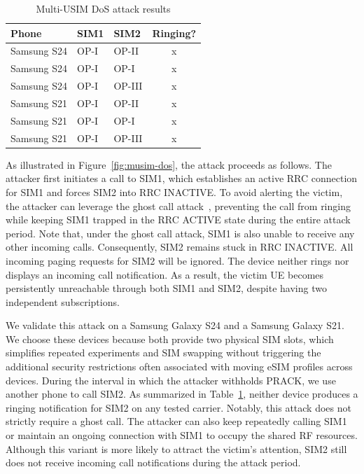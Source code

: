 \vspace{-0.1in}
\begin{table}[H]
\centering
\caption{Multi-USIM DoS attack results}
\vspace{-0.1in}
\label{tab:dual_sim_ringing_data}
\small
\begin{tabular}{l l l c}
\hline
\textbf{Phone} & \textbf{SIM1} & \textbf{SIM2} & \textbf{Ringing?} \\
\hline
Samsung S24 & OP-I & OP-II  & x \\
Samsung S24 & OP-I & OP-I   & x \\
Samsung S24 & OP-I & OP-III & x \\
Samsung S21 & OP-I & OP-II  & x \\
Samsung S21 & OP-I & OP-I   & x \\
Samsung S21 & OP-I & OP-III & x \\
\hline
\end{tabular}
\end{table}

As illustrated in Figure~\ref{fig:musim-dos}, the attack proceeds as follows.
The attacker first initiates a call to SIM1, which establishes an active RRC connection for SIM1 and forces SIM2 into RRC INACTIVE. To avoid alerting the victim, the attacker can leverage the ghost call attack~\cite{lu2020ghost,wang2021insecurity}, preventing the call from ringing while keeping SIM1 trapped in the RRC ACTIVE state during the entire attack period. 
Note that, under the ghost call attack, SIM1 is also unable to receive any other incoming calls. Consequently, SIM2 remains stuck in RRC INACTIVE. All incoming paging requests for SIM2 will be ignored. The device neither rings nor displays an incoming call notification. As a result, the victim UE becomes persistently unreachable through both SIM1 and SIM2, despite having two independent subscriptions.   


We validate this attack on a Samsung Galaxy S24 and a Samsung Galaxy S21. We choose these devices because both provide two physical SIM slots, which simplifies repeated experiments and SIM swapping without triggering the additional security restrictions often associated with moving eSIM profiles across devices. During the interval in which the attacker withholds \textsf{PRACK}, we use another phone to call SIM2. As summarized in Table~\ref{tab:dual_sim_ringing_data}, neither device produces a ringing notification for SIM2 on any tested carrier. Notably, this attack does not strictly require a ghost call. The attacker can also keep repeatedly calling SIM1 or maintain an ongoing connection with SIM1 to occupy the shared RF resources. Although this variant is more likely to attract the victim’s attention, SIM2 still does not receive incoming call notifications during the attack period.



